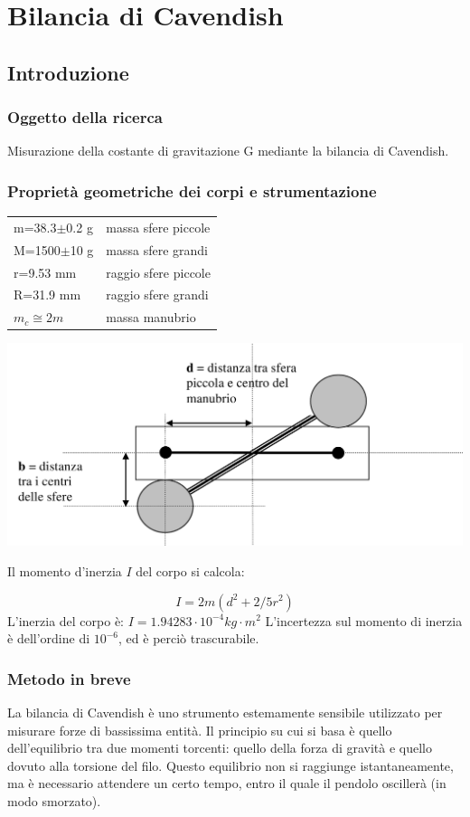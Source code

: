 \chapter{Bilancia di Cavendish}
\section{Introduzione}
\subsection{Oggetto della ricerca}
Misurazione della costante di gravitazione G mediante la bilancia di Cavendish.
\subsection{Proprietà geometriche dei corpi e strumentazione}

\begin{tabular}{ll}
m=38.3$\pm$0.2 g & massa sfere piccole\\
M=1500$\pm$10 g	 & massa sfere grandi\\
r=9.53 mm & raggio sfere piccole\\
R=31.9 mm	 & raggio sfere grandi\\
$m_c\cong 2m$ & massa manubrio\\
\end{tabular}


\begin{center}
 \includegraphics[scale=0.25]{../grafici/cavendish/schema.png}
\end{center}

Il momento d'inerzia $I$ del corpo si calcola:

$$ I=2m(d^2+2/5r^2)$$
L'inerzia del corpo è:
$I = 1.94283 \cdot 10^{-4} kg\cdot m^2$
L'incertezza sul momento di inerzia è dell'ordine di $10^{-6}$, ed è perciò trascurabile. 
\subsection{Metodo in breve}
La bilancia di Cavendish è uno strumento estemamente sensibile utilizzato per misurare forze di bassissima entità. Il principio su cui si basa è quello dell'equilibrio tra due momenti torcenti: quello della forza di gravità e quello dovuto alla torsione del filo. Questo equilibrio non si raggiunge istantaneamente, ma è necessario attendere un certo tempo, entro il quale il pendolo oscillerà (in modo smorzato).

